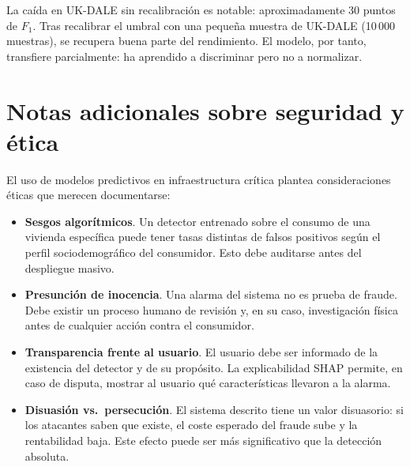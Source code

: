La caída en UK-DALE sin recalibración es notable: aproximadamente 30 puntos de $F_1$. Tras recalibrar el umbral con una pequeña muestra de UK-DALE (10\,000 muestras), se recupera buena parte del rendimiento. El modelo, por tanto, transfiere parcialmente: ha aprendido a discriminar pero no a normalizar.

\chapter{Notas adicionales sobre seguridad y ética}
\label{anx:etica}

El uso de modelos predictivos en infraestructura crítica plantea consideraciones éticas que merecen documentarse:

\begin{itemize}[leftmargin=*,topsep=0pt]
  \item \textbf{Sesgos algorítmicos}. Un detector entrenado sobre el consumo de una vivienda específica puede tener tasas distintas de falsos positivos según el perfil sociodemográfico del consumidor. Esto debe auditarse antes del despliegue masivo.
  \item \textbf{Presunción de inocencia}. Una alarma del sistema no es prueba de fraude. Debe existir un proceso humano de revisión y, en su caso, investigación física antes de cualquier acción contra el consumidor.
  \item \textbf{Transparencia frente al usuario}. El usuario debe ser informado de la existencia del detector y de su propósito. La explicabilidad SHAP permite, en caso de disputa, mostrar al usuario qué características llevaron a la alarma.
  \item \textbf{Disuasión vs.\ persecución}. El sistema descrito tiene un valor disuasorio: si los atacantes saben que existe, el coste esperado del fraude sube y la rentabilidad baja. Este efecto puede ser más significativo que la detección absoluta.
\end{itemize}
